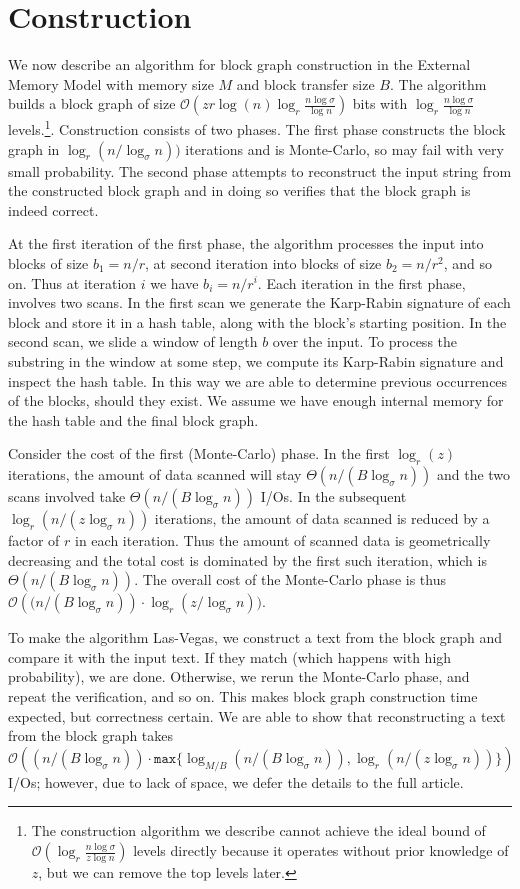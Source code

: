 \documentclass[12pt]{article}
\newcommand{\Oh}[1]
  {\ensuremath{\mathcal{O}\!\left({#1}\right)}}
\begin{document}
\section{Construction}
\label{sec:construction}
We now describe an algorithm for block graph construction in the External Memory Model with
memory size $M$ and block transfer size $B$. The algorithm builds a block graph of size 
$\Oh{zr \log (n) \log_r \frac{n\log\sigma}{\log n}}$ bits with $\log_r \frac{n\log\sigma}{\log n}$ 
levels.\footnote{The construction algorithm we describe cannot achieve the ideal bound of $\Oh{\log_r \frac{n \log \sigma}{z\log  n}}$ levels directly because it operates without prior knowledge of $z$, but we can remove the top levels later.}.
Construction consists of two phases. The first phase constructs the block graph in 
$\log_r (n/\log_\sigma n))$ iterations and is Monte-Carlo, so may fail with very small 
probability. The second phase attempts to reconstruct the input string from the constructed 
block graph and in doing so verifies that the block graph is indeed correct.

At the first iteration of the first phase, the algorithm processes the input
into blocks of size $b_1=n/r$, at second iteration into blocks of size $b_2=n/r^2$, and so on.
Thus at iteration $i$ we have $b_i=n/r^i$.
Each iteration in the first phase, involves two scans.
In the first scan we generate the Karp-Rabin signature of each block and store it in a hash table,
along with the block's starting position.
In the second scan, we slide a window of length $b$ over the input. To process the substring in the window at some step,
we compute
its Karp-Rabin signature and inspect the hash table. In this way we are able to determine previous
occurrences of the blocks, should they exist.
We assume we have enough internal memory for the hash table and the final block graph.

Consider the cost of the first (Monte-Carlo) phase.
In the first $\log_r(z)$ iterations, the amount of data scanned will stay $\Theta(n/(B\log_\sigma n))$
and the two scans involved take $\Theta(n/(B\log_\sigma n))$ I/Os. In the subsequent
$\log_r(n/(z\log_\sigma n))$ iterations, the amount of data scanned is reduced by a factor of $r$ in
each iteration. Thus the amount of scanned data is geometrically decreasing and the total cost is dominated
by the first such iteration, which is $\Theta(n/(B\log_\sigma n))$.
The overall cost of the Monte-Carlo phase is thus
$\Oh{(n/(B\log_\sigma n)}\cdot\log_r(z/\log_\sigma n))$.

To make the algorithm Las-Vegas, we construct a text from the block graph and compare
it with the input text. If they match (which happens with high probability), we are done.
Otherwise, we rerun the Monte-Carlo phase, and repeat the verification, and so on.
This makes block graph construction time expected, but correctness certain. 
We are able to show that reconstructing a text from the block graph takes
$$\Oh{ (n/(B\log_\sigma n))\cdot \mathtt{max}\{\log_{M/B}(n/(B\log_\sigma n)),\log_r(n/(z\log_\sigma n))\}}$$
I/Os; however, due to lack of space, we defer the details to the full article. 
\end{document}
